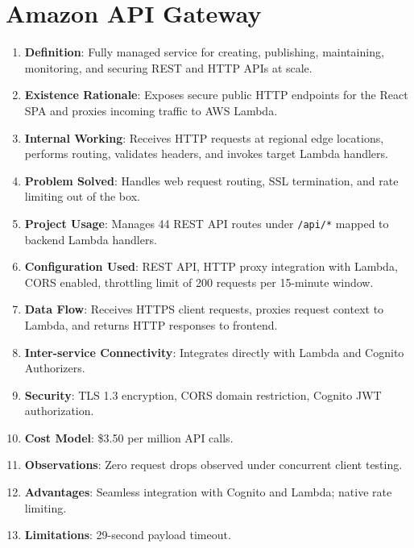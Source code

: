 \section{Amazon API Gateway}
\begin{enumerate}
    \item \textbf{Definition}: Fully managed service for creating, publishing, maintaining, monitoring, and securing REST and HTTP APIs at scale.
    \item \textbf{Existence Rationale}: Exposes secure public HTTP endpoints for the React SPA and proxies incoming traffic to AWS Lambda.
    \item \textbf{Internal Working}: Receives HTTP requests at regional edge locations, performs routing, validates headers, and invokes target Lambda handlers.
    \item \textbf{Problem Solved}: Handles web request routing, SSL termination, and rate limiting out of the box.
    \item \textbf{Project Usage}: Manages 44 REST API routes under \texttt{/api/*} mapped to backend Lambda handlers.
    \item \textbf{Configuration Used}: REST API, HTTP proxy integration with Lambda, CORS enabled, throttling limit of 200 requests per 15-minute window.
    \item \textbf{Data Flow}: Receives HTTPS client requests, proxies request context to Lambda, and returns HTTP responses to frontend.
    \item \textbf{Inter-service Connectivity}: Integrates directly with Lambda and Cognito Authorizers.
    \item \textbf{Security}: TLS 1.3 encryption, CORS domain restriction, Cognito JWT authorization.
    \item \textbf{Cost Model}: \$3.50 per million API calls.
    \item \textbf{Observations}: Zero request drops observed under concurrent client testing.
    \item \textbf{Advantages}: Seamless integration with Cognito and Lambda; native rate limiting.
    \item \textbf{Limitations}: 29-second payload timeout.
\end{enumerate}

